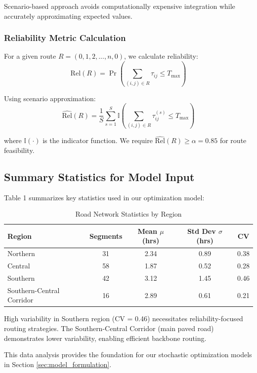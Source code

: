 Scenario-based approach avoids computationally expensive integration while accurately approximating expected values.

\subsubsection{Reliability Metric Calculation}

For a given route $R = (0, 1, 2, ..., n, 0)$, we calculate reliability:
\begin{equation}
\text{Rel}(R) = \Pr\left(\sum_{(i,j) \in R} \tau_{ij} \leq T_{\max}\right)
\end{equation}

Using scenario approximation:
\begin{equation}
\widehat{\text{Rel}}(R) = \frac{1}{S}\sum_{s=1}^S \mathbb{I}\left(\sum_{(i,j) \in R} \tau_{ij}^{(s)} \leq T_{\max}\right)
\end{equation}

where $\mathbb{I}(\cdot)$ is the indicator function. We require $\widehat{\text{Rel}}(R) \geq \alpha = 0.85$ for route feasibility.

\subsection{Summary Statistics for Model Input}

Table 1 summarizes key statistics used in our optimization model:

\begin{table}[H]
\centering
\caption{Road Network Statistics by Region}
\begin{tabular}{lcccc}
\toprule
Region & Segments & Mean $\mu$ (hrs) & Std Dev $\sigma$ (hrs) & CV \\
\midrule
Northern & 31 & 2.34 & 0.89 & 0.38 \\
Central & 58 & 1.87 & 0.52 & 0.28 \\
Southern & 42 & 3.12 & 1.45 & 0.46 \\
Southern-Central Corridor & 16 & 2.89 & 0.61 & 0.21 \\
\bottomrule
\end{tabular}
\end{table}

High variability in Southern region (CV = 0.46) necessitates reliability-focused routing strategies. The Southern-Central Corridor (main paved road) demonstrates lower variability, enabling efficient backbone routing.

This data analysis provides the foundation for our stochastic optimization models in Section \ref{sec:model_formulation}.
